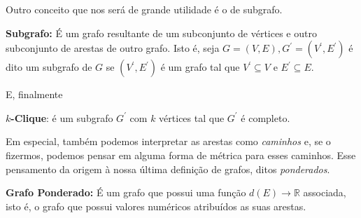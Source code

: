 \documentclass[a4paper,12pt]{article}
\begin{document}
Outro conceito que nos será de grande utilidade é o de subgrafo.
\begin{center}
	\begin{minipage}{0.9 \linewidth}
		\textbf{Subgrafo:} É um grafo resultante de um subconjunto de vértices e outro subconjunto de arestas de outro grafo. Isto é, seja $G = (V, E), G^\prime = (V^\prime, E^\prime)$ é dito um subgrafo de $G$ se $(V^\prime, E^\prime)$ é um grafo tal que $V^\prime \subseteq V$ e $E^\prime \subseteq E$.
	\end{minipage}
\end{center}

E, finalmente
\begin{center}
	\begin{minipage}{0.9 \linewidth}
		\textbf{$k$-Clique}: é um subgrafo $G^\prime$ com $k$ vértices tal que $G^\prime$ é completo.
	\end{minipage}
\end{center}

Em especial, também podemos interpretar as arestas como \textit{caminhos} e, se o fizermos, podemos pensar em alguma forma de métrica para esses caminhos. Esse pensamento da origem à nossa última definição de grafos, ditos \textit{ponderados}.

\begin{center}
	\begin{minipage}{0.9 \linewidth}
		\textbf{Grafo Ponderado:} É um grafo que possui uma função $d(E) \rightarrow \mathbb{R}$ associada, isto é, o grafo que possui valores numéricos atribuídos as suas arestas.
	\end{minipage}
\end{center}

{}



\end{document}
